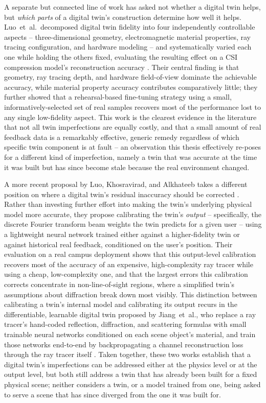 \documentclass{iutbscthesis}
\begin{document}
A separate but connected line of work has asked not whether a digital twin helps, but \emph{which parts} of a digital twin's construction determine how well it helps. Luo~et~al.\ decomposed digital twin fidelity into four independently controllable aspects -- three-dimensional geometry, electromagnetic material properties, ray tracing configuration, and hardware modeling -- and systematically varied each one while holding the others fixed, evaluating the resulting effect on a CSI compression model's reconstruction accuracy \cite{luo2025fidelity}. Their central finding is that geometry, ray tracing depth, and hardware field-of-view dominate the achievable accuracy, while material property accuracy contributes comparatively little; they further showed that a rehearsal-based fine-tuning strategy using a small, informatively-selected set of real samples recovers most of the performance lost to any single low-fidelity aspect. This work is the clearest evidence in the literature that not all twin imperfections are equally costly, and that a small amount of real feedback data is a remarkably effective, generic remedy regardless of which specific twin component is at fault -- an observation this thesis effectively re-poses for a different kind of imperfection, namely a twin that was accurate at the time it was built but has since become stale because the real environment changed.

A more recent proposal by Luo, Khosravirad, and Alkhateeb takes a different position on where a digital twin's residual inaccuracy should be corrected \cite{luo2026calibration}. Rather than investing further effort into making the twin's underlying physical model more accurate, they propose calibrating the twin's \emph{output} -- specifically, the discrete Fourier transform beam weights the twin predicts for a given user -- using a lightweight neural network trained either against a higher-fidelity twin or against historical real feedback, conditioned on the user's position. Their evaluation on a real campus deployment shows that this output-level calibration recovers most of the accuracy of an expensive, high-complexity ray tracer while using a cheap, low-complexity one, and that the largest errors this calibration corrects concentrate in non-line-of-sight regions, where a simplified twin's assumptions about diffraction break down most visibly. This distinction between calibrating a twin's internal model and calibrating its output recurs in the differentiable, learnable digital twin proposed by Jiang~et~al., who replace a ray tracer's hand-coded reflection, diffraction, and scattering formulas with small trainable neural networks conditioned on each scene object's material, and train those networks end-to-end by backpropagating a channel reconstruction loss through the ray tracer itself \cite{jiang2025learnable}. Taken together, these two works establish that a digital twin's imperfections can be addressed either at the physics level or at the output level, but both still address a twin that has already been built for a fixed physical scene; neither considers a twin, or a model trained from one, being asked to serve a scene that has since diverged from the one it was built for.
\end{document}
